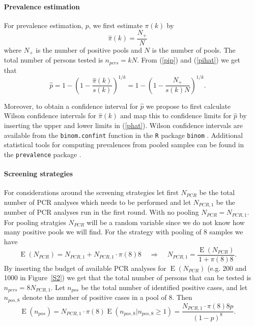 \documentclass[10pt]{article}
\DeclareMathOperator{\E}{E}
\begin{document}
\paragraph*{Prevalence estimation}
For prevalence estimation, $p$,  we first  estimate $\pi(k)$ by 
\begin{equation}
\label{pihat}
\hat{\pi}(k)=\frac{N_{+}}{N}
\end{equation}
where $N_{+}$  is the number of positive pools and $N$ is the number of pools.  The total number of persons tested is $n_{pers}=kN$. From (\ref{pip})  and (\ref{pihat}) we get that 
\begin{equation}
\label{phat}
\hat{p}=1-\left(1-\frac{\hat{\pi}(k)}{s(k)}\right)^{1/k}=1-\left(1-\frac{N_+}{s(k)N}\right)^{1/k}.
\end{equation}

Moreover, to obtain a confidence interval for $\hat p$ we propose to first calculate Wilson confidence intervals \cite{agresti_approximate_1998} for $\hat{\pi}(k)$ and map this to confidence limits for $\hat p$ by inserting the upper and lower limits in (\ref{phat}). Wilson confidence intervals are available from the {\tt binom.confint} function in the {\tt R} package {\tt binom} \cite{R,binom}. Additional statistical tools for computing prevalences from pooled samples can be found in the {\tt prevalence} package \cite{prevalence,speybroeck_estimating_2012}.

\paragraph*{Screening strategies}
For considerations around the screening strategies let first $N_{PCR}$ be the total number of PCR analyses which needs to be performed and let $N_{PCR,1}$ be the number of PCR analyses run in the first round. With no pooling $N_{PCR}=N_{PCR,1}$. For pooling stratgies $N_{PCR}$ will be a random variable since we do not know how many positive pools we will find. For the strategy with pooling of 8 samples we have
$$
\E(N_{PCR})=N_{PCR,1}+N_{PCR,1}\cdot\pi(8) 8 
\;\;\;\;  \Rightarrow  \;\;\;\;
N_{PCR,1}=\frac{\E(N_{PCR})}{1+\pi(8) 8}. 
$$
By inserting the budget of available PCR analyses for $\E(N_{PCR})$ (e.g. 200 and 1000 in Figure~\ref{S2}) we get that the total number of persons that can be tested is $n_{pers}=8N_{PCR,1}$. Let $n_{pos}$ be the total number of identified positive cases, and let $n_{pos,8}$ denote the number of positive cases in a pool of 8. Then
$$
\E(n_{pos})=N_{PCR,1}\cdot\pi(8)\E(n_{pos,8}|n_{pos,8}\geq 1)=\frac{N_{PCR,1}\cdot \pi(8) 8 p}{(1-p)^8}.
$$  
\end{document}

